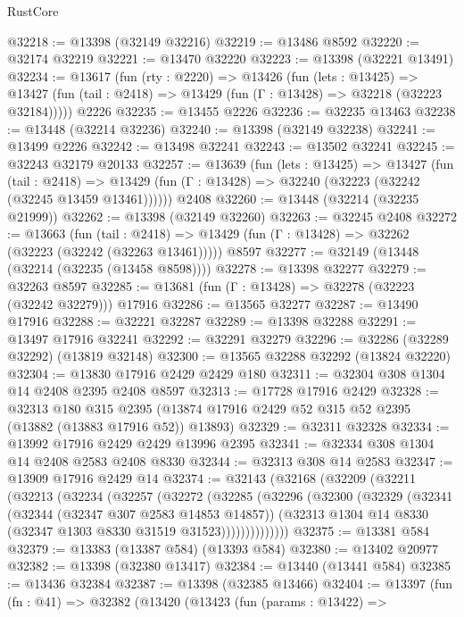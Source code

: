 \begin{lexlean}{RustCore}
\begin{coremodule}
@32218 := @13398 (@32149 @32216)
@32219 := @13486 @8592
@32220 := @32174 @32219
@32221 := @13470 @32220
@32223 := @13398 (@32221 @13491)
@32234 := @13617
    (fun (rty : @2220) =>
    @13426
      (fun (lets : @13425) =>
      @13427 (fun (tail : @2418) => @13429 (fun (Γ : @13428) => @32218 (@32223 @32184)))))
    @2226
@32235 := @13455 @2226
@32236 := @32235 @13463
@32238 := @13448 (@32214 @32236)
@32240 := @13398 (@32149 @32238)
@32241 := @13499 @2226
@32242 := @13498 @32241
@32243 := @13502 @32241
@32245 := @32243 @32179 @20133
@32257 := @13639
    (fun (lets : @13425) =>
    @13427
      (fun (tail : @2418) =>
      @13429 (fun (Γ : @13428) => @32240 (@32223 (@32242 (@32245 @13459 @13461))))))
    @2408
@32260 := @13448 (@32214 (@32235 @21999))
@32262 := @13398 (@32149 @32260)
@32263 := @32245 @2408
@32272 := @13663
    (fun (tail : @2418) => @13429 (fun (Γ : @13428) => @32262 (@32223 (@32242 (@32263 @13461)))))
    @8597
@32277 := @32149 (@13448 (@32214 (@32235 (@13458 @8598))))
@32278 := @13398 @32277
@32279 := @32263 @8597
@32285 := @13681 (fun (Γ : @13428) => @32278 (@32223 (@32242 @32279))) @17916
@32286 := @13565 @32277
@32287 := @13490 @17916
@32288 := @32221 @32287
@32289 := @13398 @32288
@32291 := @13497 @17916 @32241
@32292 := @32291 @32279
@32296 := @32286 (@32289 @32292) (@13819 @32148)
@32300 := @13565 @32288 @32292 (@13824 @32220)
@32304 := @13830 @17916 @2429 @2429 @180
@32311 := @32304 @308 @1304 @14 @2408 @2395 @2408 @8597
@32313 := @17728 @17916 @2429
@32328 := @32313
    @180
    @315
    @2395
    (@13874 @17916 @2429 @52 @315 @52 @2395 (@13882 (@13883 @17916 @52)) @13893)
@32329 := @32311 @32328
@32334 := @13992 @17916 @2429 @2429 @13996 @2395
@32341 := @32334 @308 @1304 @14 @2408 @2583 @2408 @8330
@32344 := @32313 @308 @14 @2583
@32347 := @13909 @17916 @2429 @14
@32374 := @32143
    (@32168
      (@32209
        (@32211
          (@32213
            (@32234
              (@32257
                (@32272
                  (@32285
                    (@32296
                      (@32300
                        (@32329
                          (@32341
                            (@32344 (@32347 @307 @2583 @14853 @14857))
                            (@32313 @1304 @14 @8330 (@32347 @1303 @8330 @31519 @31523))))))))))))))
@32375 := @13381 @584
@32379 := @13383 (@13387 @584) (@13393 @584)
@32380 := @13402 @20977
@32382 := @13398 (@32380 @13417)
@32384 := @13440 (@13441 @584)
@32385 := @13436 @32384
@32387 := @13398 (@32385 @13466)
@32404 := @13397
    (fun (fn : @41) =>
    @32382
      (@13420
        (@13423
          (fun (params : @13422) =>

\end{coremodule}
\end{lexlean}
